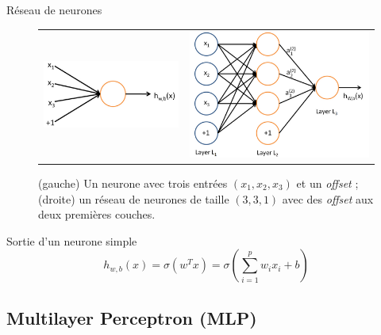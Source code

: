 \begin{frame}{Réseau de neurones}
\begin{figure}[ht!]
\centering
\begin{tabular}{cc}
\includegraphics[width = .4\columnwidth]{../fig/SingleNeuron.png} &
\includegraphics[width = .4\columnwidth]{../fig/Network331.png} 
\end{tabular}
\caption{(gauche) Un neurone avec trois entrées $(x_1,x_2,x_3)$ et un \emph{offset} ; (droite) un réseau de neurones de taille $(3,3,1)$ avec des \emph{offset} aux deux premières couches.}
\label{fig1}
\end{figure}
\begin{block}{Sortie d'un neurone simple}
\begin{equation}
h_{w,b}(x)=\sigma(w^Tx)=\sigma\left(\sum_{i=1}^p w_i x_i + b\right)
\end{equation}
\end{block}
\end{frame}



\subsection{Multilayer Perceptron (MLP)}

